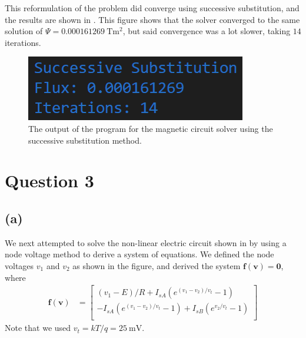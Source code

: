 \documentclass[journal,hidelinks]{IEEEtran}
\begin{document}
This reformulation of the problem did converge using successive substitution, and the results are shown in . This figure shows that the solver converged to the same solution of $\Psi = \SI{0.000161269}{\tesla\meter^2}$, but said convergence was a lot slower, taking $14$ iterations.

\begin{figure}[!htb]
  \centering
  \includegraphics[width=0.8\columnwidth]{question-2/q2c.png}
  \caption{The output of the program for the magnetic circuit solver using the successive substitution method.}
  \label{fig:q2c}
\end{figure}

\section*{Question 3}

\subsection*{(a)}

We next attempted to solve the non-linear electric circuit shown in  by using a node voltage method to derive a system of equations. We defined the node voltages $v_1$ and $v_2$ as shown in the figure, and derived the system $\boldsymbol{f}(\boldsymbol{v}) = \boldsymbol{0}$, where
\begin{align}
\boldsymbol{f}(\boldsymbol{v}) &=
\begin{bmatrix}
(v_1 - E) / R + I_{sA} (e^{(v_1 - v_2)/v_t} - 1) \\
-I_{sA} (e^{(v_1 - v_2)/v_t} - 1) + I_{sB} (e^{v_2/v_t} - 1) \\
\end{bmatrix}
\end{align}
Note that we used $v_t = kT/q = \SI{25}{\milli\volt}$.
\end{document}
